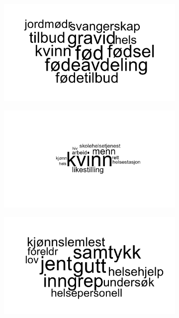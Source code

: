 \documentclass[12pt]{article}
\begin{document}
	\begin{figure}[h]
		\caption{\textit{Topics relevant to "women's issues"}}
		\begin{subfigure}{0.3\linewidth}
			\includegraphics[scale=0.40]{topic119wordcloud.png}
		\end{subfigure}
		\begin{subfigure}{0.3\linewidth}
			\includegraphics[scale=0.40]{topic135wordcloud.png}
		\end{subfigure}
		\begin{subfigure}{0.3\linewidth}
			\includegraphics[scale=0.40]{topic138wordcloud.png}
		\end{subfigure}
	\end{figure}
	
\end{document}
